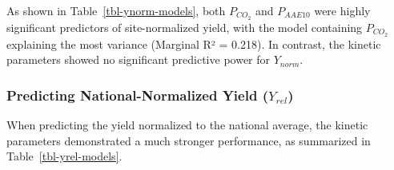 \documentclass[
  a4paper,
]{article}
\begin{document}
As shown in Table~\ref{tbl-ynorm-models}, both \(P_{CO_2}\) and
\(P_{AAE10}\) were highly significant predictors of site-normalized
yield, with the model containing \(P_{CO_2}\) explaining the most
variance (Marginal R² = 0.218). In contrast, the kinetic parameters
showed no significant predictive power for \(Y_{norm}\).

\subsubsection{\texorpdfstring{Predicting National-Normalized Yield
(\(Y_{rel}\))}{Predicting National-Normalized Yield (Y\_\{rel\})}}\label{sec-yrel}

When predicting the yield normalized to the national average, the
kinetic parameters demonstrated a much stronger performance, as
summarized in Table~\ref{tbl-yrel-models}.
\end{document}
